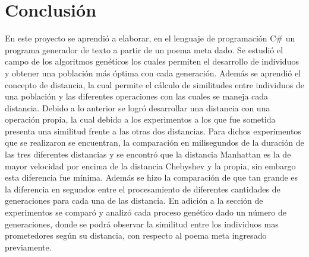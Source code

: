 \documentclass[journal]{IEEEtran}
\begin{document}
\section{Conclusión}
	En este proyecto se aprendió a elaborar, en el lenguaje de programación C\# un programa generador de texto a partir de un poema meta dado. Se estudió el campo de los algoritmos genéticos los cuales permiten el desarrollo de individuos y obtener una población más óptima con cada generación. Además se aprendió el concepto de distancia, la cual permite el cálculo de similitudes entre individuos de una población y las diferentes operaciones con las cuales se maneja cada distancia. Debido a lo anterior se logró desarrollar una distancia con una operación propia, la cual debido a los experimentos a los que fue sometida presenta una similitud frente a las otras dos distancias. Para dichos experimentos que se realizaron se encuentran, la comparación en milisegundos de la duración de las tres diferentes distancias y se encontró que la distancia Manhattan es la de mayor velocidad por encima de la distancia Chebyshev y la propia, sin embargo esta diferencia fue mínima. Además se hizo la comparación de que tan grande es la diferencia en segundos entre el procesamiento de diferentes cantidades de generaciones para cada una de las distancia. En adición a la sección de experimentos se comparó y analizó cada proceso genético dado un número de generaciones, donde se podrá observar la similitud entre los individuos mas prometedores según su distancia, con respecto al poema meta ingresado previamente.
	
\end{document}
